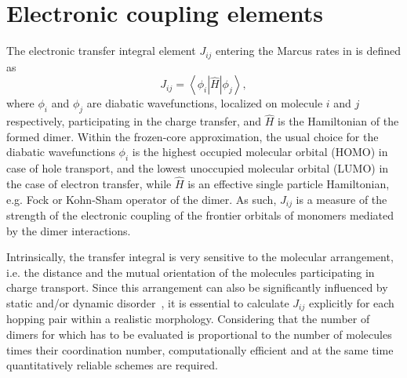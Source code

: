 \section{Electronic coupling elements}
\label{sec:transfer_integrals}

The electronic transfer integral element $J_{ij}$ entering the Marcus rates in  is defined as
\begin{equation}
   J_{ij} = \left\langle \phi_i \left\vert \hat{H} \right\vert \phi_j \right\rangle ,
\label{equ:TI}
\end{equation}
where $\phi_i$ and $\phi_j$ are diabatic wavefunctions, localized on molecule $i$ and $j$ respectively, participating in the charge transfer, and $\hat{H}$ is the Hamiltonian of the formed dimer. Within the frozen-core approximation, the usual choice for the diabatic wavefunctions $\phi_i$ is the highest occupied molecular orbital (HOMO) in case of hole transport, and the lowest unoccupied molecular orbital (LUMO) in the case of electron transfer, while $\hat{H}$ is an effective single particle Hamiltonian, e.g. Fock or Kohn-Sham operator of the dimer. As such, $J_{ij}$ is a measure of the strength of the electronic coupling of the frontier orbitals of monomers mediated by the dimer interactions. 

Intrinsically, the transfer integral is very sensitive to the molecular arrangement, i.e. the distance and the mutual orientation of the molecules participating in charge transport. Since this arrangement can also be significantly influenced by static and/or dynamic disorder~\cite{baessler_charge_1993,troisi_charge-transport_2006,troisi_charge_2009,mcmahon_organic_2010,vehoff_charge_2010},
it is essential to calculate $J_{ij}$ explicitly for each hopping pair within a realistic morphology. Considering that the number of dimers for which  has to be evaluated is proportional to the number of molecules times their coordination number, computationally efficient and at the same time quantitatively reliable schemes are required.







